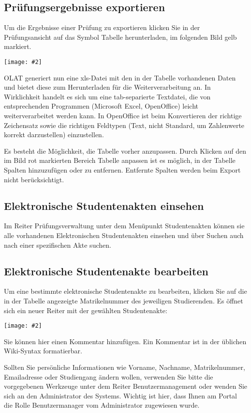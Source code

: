 \documentclass[a4paper,11pt]{article}
\newcommand{\bild}[2]{
    \begin{center}\texttt{[image: \#2]}\end{center}
}
\newcommand{\knopf}[1]{{\sc #1}}
\begin{document}
\subsection{Prüfungsergebnisse exportieren}

Um die Ergebnisse einer Prüfung zu exportieren klicken Sie in der
Prüfungsansicht auf das Symbol \knopf{Tabelle herunterladen}, im folgenden
Bild gelb markiert.

\bild{.9}{Ergebnis-Exportieren}

OLAT generiert nun eine xls-Datei mit den in der Tabelle vorhandenen Daten und
bietet diese zum Herunterladen für die Weiterverarbeitung an.  In Wirklichkeit
handelt es sich um eine tab-separierte Textdatei, die von entsprechenden
Programmen (Microsoft Excel, OpenOffice) leicht weiterverarbeitet werden kann.
In OpenOffice ist beim Konvertieren der richtige Zeichensatz sowie die
richtigen Feldtypen (Text, nicht Standard, um Zahlenwerte korrekt
darzustellen) einzustellen.

Es besteht die Möglichkeit, die Tabelle vorher anzupassen. Durch Klicken auf
den im Bild rot markierten Bereich \knopf{Tabelle anpassen} ist es möglich, in
der Tabelle Spalten hinzuzufügen oder zu entfernen. Entfernte Spalten werden
beim Export nicht berücksichtigt.

\subsection{Elektronische Studentenakten einsehen}

Im Reiter \knopf{Prüfungsverwaltung} unter dem Menüpunkt \knopf{Studentenakten}
können sie alle vorhandenen Elektronischen Studentenakten einsehen und über
\knopf{Suchen} auch nach einer spezifischen Akte suchen.

\subsection{Elektronische Studentenakte bearbeiten}

Um eine bestimmte elektronische Studentenakte zu bearbeiten, klicken Sie auf
die in der Tabelle angezeigte Matrikelnummer des jeweiligen Studierenden.
Es öffnet sich ein neuer Reiter mit der gewählten Studentenakte:

\bild{.9}{ESA-Edit}

Sie können hier einen \knopf{Kommentar hinzufügen}. Ein Kommentar ist in der
üblichen Wiki-Syntax formatierbar.

Sollten Sie persönliche Informationen wie Vorname, Nachname,
Matrikelnummer, Emailadresse oder Studiengang ändern wollen, verwenden Sie
bitte die vorgegebenen Werkzeuge unter dem Reiter \knopf{Benutzermanagement}
oder wenden Sie sich an den Administrator des Systems. Wichtig ist hier, dass
Ihnen am Portal die Rolle Benutzermanager vom Administrator zugewiesen wurde.
\end{document}
